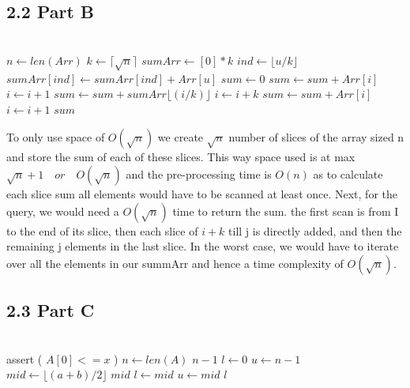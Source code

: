 \documentclass[12pt]{article}
\begin{document}
\subsection*{2.2 Part B}
\vspace{10pt}

\begin{algorithmic}
 \\
\State $n \gets len(Arr)$ \quad {}
\State $k \gets \lceil \sqrt{n} \rceil$ \quad {}
\State $sumArr \gets [0]*k$
 \quad {}
\State $ind \gets \lfloor u/k\rfloor$ \quad {}
\State $sumArr[ind] \gets sumArr[ind]+Arr[u]$
\EndFor
\State $sum \gets 0$
\State $sum \gets sum+Arr[i]$
\State $i \gets i+1$
\EndWhile
{}
\State $sum \gets sum+sumArr\lfloor(i/k)\rfloor$
\State $i \gets i+k$
\EndWhile
{}
\State $sum \gets sum+Arr[i]$
\State $i \gets i+1$
\EndWhile
\Return $sum$
\EndProcedure
\end{algorithmic}

To only use space of \(O(\sqrt{n})\) we create \(\sqrt{n}\) number of slices of the array sized n and store the sum of each of these slices. This way space used is at max \(\sqrt{n}+1 \quad or \quad O(\sqrt{n})\) and the pre-processing time is \(O(n)\) as to calculate each slice sum all elements would have to be scanned at least once. Next, for the query, we would need a \(O(\sqrt{n})\) time to return the sum. the first scan is from I to the end of its slice, then each slice of \(i+k\) till j is directly added, and then the remaining j elements in the last slice. In the worst case, we would have to iterate over all the elements in our summArr and hence a time complexity of \(O(\sqrt{n})\).

\subsection*{2.3 Part C}
\vspace{10pt}

\begin{algorithmic}
 \\
assert ( $A[ 0 ] <= x$ )
\State $n \gets len(A)$
    \Return $n-1$
\EndIf
\State $l \gets 0$
\State $u \gets n-1$  \\
\State $mid \gets \lfloor(a+b)/2\rfloor$
\Return $mid$
\State $l \gets mid$
\Else
\State $u \gets mid$
\EndIf
\EndWhile
\Return $l$
\EndProcedure
\end{algorithmic}
\end{document}
